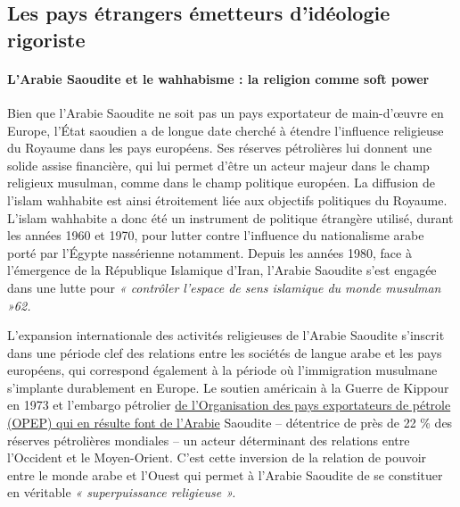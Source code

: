 \subsection{Les pays étrangers émetteurs d'idéologie
rigoriste}

\paragraph{L'Arabie Saoudite et le wahhabisme : la religion comme soft
power}

Bien que l'Arabie Saoudite ne soit pas un pays exportateur de
main-d'œuvre en Europe, l'État saoudien a de longue date cherché à
étendre l'influence religieuse du Royaume dans les pays européens. Ses
réserves pétrolières lui donnent une solide assise financière, qui lui
permet d'être un acteur majeur dans le champ religieux musulman, comme
dans le champ politique européen. La diffusion de l'islam wahhabite est
ainsi étroitement liée aux objectifs politiques du Royaume. L'islam
wahhabite a donc été un instrument de politique étrangère utilisé,
durant les années 1960 et 1970, pour lutter contre l'influence du
nationalisme arabe porté par l'Égypte nassérienne notamment. Depuis les
années 1980, face à l'émergence de la République Islamique d'Iran,
l'Arabie Saoudite s'est engagée dans une lutte pour \emph{« contrôler
l'espace de sens islamique du monde musulman »62.}

L'expansion internationale des activités religieuses de l'Arabie
Saoudite s'inscrit dans une période clef des relations entre les
sociétés de langue arabe et les pays européens, qui correspond également
à la période où l'immigration musulmane s'implante durablement en
Europe. Le soutien américain à la Guerre de Kippour en 1973 et l'embargo
pétrolier \underline{de l'Organisation des pays exportateurs de pétrole
(OPEP) qui en résulte font de l'Arabie} Saoudite -- détentrice de près de 22 \% des réserves pétrolières
mondiales -- un acteur déterminant des relations entre l'Occident et le
Moyen-Orient. C'est cette inversion de la relation de pouvoir entre le
monde arabe et l'Ouest qui permet à l'Arabie Saoudite de se constituer
en véritable \emph{« superpuissance religieuse »}\emph{.}

